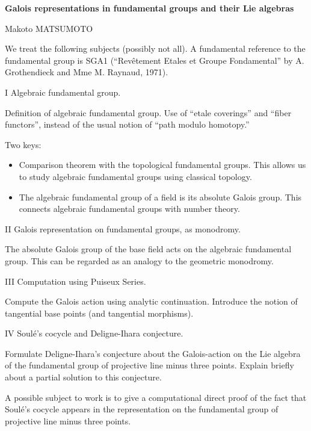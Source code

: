 \documentclass[11pt]{article}
\begin{document}
\centerline{\bf Galois representations in fundamental groups 
 and their Lie algebras
}
\medskip
\centerline{Makoto MATSUMOTO}
We treat the following subjects (possibly not all).
A fundamental reference to the fundamental group is SGA1
(``Rev\^{e}tement Etales et Groupe Fondamental'' 
by A. Grothendieck and Mme M. Raynaud, 1971).

\begin{description}
\item{I} Algebraic fundamental group. 

Definition of algebraic fundamental group.
Use of ``etale coverings'' and ``fiber functors'', instead of
the usual notion of ``path modulo homotopy.''

Two keys:
\begin{itemize}
\item Comparison theorem with the topological fundamental groups.
This allows us to study algebraic fundamental groups 
using classical topology.

\item The algebraic fundamental group of a field is
its absolute Galois group. This connects algebraic fundamental groups
with number theory. 
\end{itemize}

\item{II}
Galois representation on fundamental groups, as monodromy.

The absolute Galois group of the base field acts on the algebraic
fundamental group. This can be regarded as an analogy to 
the geometric monodromy.

\item{III}
Computation using Puiseux Series. 

Compute the Galois action using analytic continuation.
Introduce the notion of tangential base points (and tangential morphisms).

\item{IV}
Soul\'e's cocycle and Deligne-Ihara conjecture.

Formulate Deligne-Ihara's conjecture about 
the Galois-action on the Lie algebra of 
the fundamental group of
projective line minus three points. Explain briefly
about a partial solution to this conjecture.
\end{description}

A possible subject to work is 
to give a computational direct proof of the 
fact that Soul\'e's cocycle appears
in the representation on the fundamental group
of projective line minus three points.
\end{document}

